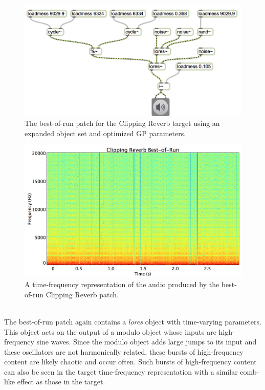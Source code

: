 \documentclass[12pt]{report} 	%
\numberwithin{figure}{chapter}
\numberwithin{table}{chapter}
\numberwithin{equation}{chapter}
\begin{document}
\begin{flushleft}
\begin{figure}[h!]
\begin{center}
\includegraphics[width=\linewidth]{ClippingReverb_Best}
\caption[Clipping reverb best-of-run patch]{The best-of-run patch for the Clipping Reverb target using an expanded object set and optimized GP parameters.}
\end{center}
\end{figure}
\begin{figure}[h!]
\begin{center}
\includegraphics[scale=0.35,width=\linewidth]{ClippingReverbBestOfRunSTFT}
\caption[Best-of-run clipping reverb time-frequency representation]{A time-frequency representation of the audio produced by the best-of-run Clipping Reverb patch.}
\end{center}
\end{figure}
\\

The best-of-run patch again contains a \textit{lores\texttildelow{}} object with time-varying parameters. This object acts on the output of a modulo object whose inputs are high-frequency sine waves. Since the modulo object adds large jumps to its input and these oscillators are not harmonically related, these bursts of high-frequency content are likely chaotic and occur often. Such bursts of high-frequency content can also be seen in the target time-frequency representation with a similar comb-like effect as those in the target.


\end{flushleft}
\end{document}
